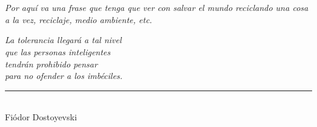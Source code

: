 \chapter*{} %


\begin{block}[todo]
    \textit{Por aquí va una frase que tenga que ver con salvar el mundo reciclando una cosa a la vez, reciclaje, medio ambiente, etc.}
\end{block}

\begin{flushright}
    \textit{La tolerancia llegará a tal nivel \\ que las personas inteligentes \\ tendrán prohibido pensar \\ para no ofender a los imbéciles. 
    } \\
    \rule{5cm}{0.5pt} 
    \\ Fiódor Dostoyevski
\end{flushright}

